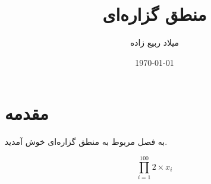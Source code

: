 \documentclass[12pt]{report}
\title{منطق گزاره‌ای}
\author{میلاد ربیع زاده}
\date{\today}
\begin{document}
\pagestyle{plain}
\setcounter{page}{1}

\maketitle

\tableofcontents

\newpage


\chapter{مقدمه}


به فصل مربوط به منطق گزاره‌ای خوش آمدید.

$$\prod_{i = 1}^{100} 2 \times x_i$$
\end{document}
